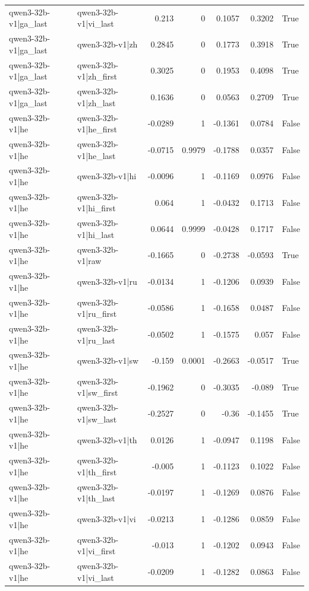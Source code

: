 \begin{table}
\begin{tabular}{l l r r r r l}
qwen3-32b-v1|ga_last & qwen3-32b-v1|vi_last & 0.213 & 0 & 0.1057 & 0.3202 & True \\
qwen3-32b-v1|ga_last & qwen3-32b-v1|zh & 0.2845 & 0 & 0.1773 & 0.3918 & True \\
qwen3-32b-v1|ga_last & qwen3-32b-v1|zh_first & 0.3025 & 0 & 0.1953 & 0.4098 & True \\
qwen3-32b-v1|ga_last & qwen3-32b-v1|zh_last & 0.1636 & 0 & 0.0563 & 0.2709 & True \\
qwen3-32b-v1|he & qwen3-32b-v1|he_first & -0.0289 & 1 & -0.1361 & 0.0784 & False \\
qwen3-32b-v1|he & qwen3-32b-v1|he_last & -0.0715 & 0.9979 & -0.1788 & 0.0357 & False \\
qwen3-32b-v1|he & qwen3-32b-v1|hi & -0.0096 & 1 & -0.1169 & 0.0976 & False \\
qwen3-32b-v1|he & qwen3-32b-v1|hi_first & 0.064 & 1 & -0.0432 & 0.1713 & False \\
qwen3-32b-v1|he & qwen3-32b-v1|hi_last & 0.0644 & 0.9999 & -0.0428 & 0.1717 & False \\
qwen3-32b-v1|he & qwen3-32b-v1|raw & -0.1665 & 0 & -0.2738 & -0.0593 & True \\
qwen3-32b-v1|he & qwen3-32b-v1|ru & -0.0134 & 1 & -0.1206 & 0.0939 & False \\
qwen3-32b-v1|he & qwen3-32b-v1|ru_first & -0.0586 & 1 & -0.1658 & 0.0487 & False \\
qwen3-32b-v1|he & qwen3-32b-v1|ru_last & -0.0502 & 1 & -0.1575 & 0.057 & False \\
qwen3-32b-v1|he & qwen3-32b-v1|sw & -0.159 & 0.0001 & -0.2663 & -0.0517 & True \\
qwen3-32b-v1|he & qwen3-32b-v1|sw_first & -0.1962 & 0 & -0.3035 & -0.089 & True \\
qwen3-32b-v1|he & qwen3-32b-v1|sw_last & -0.2527 & 0 & -0.36 & -0.1455 & True \\
qwen3-32b-v1|he & qwen3-32b-v1|th & 0.0126 & 1 & -0.0947 & 0.1198 & False \\
qwen3-32b-v1|he & qwen3-32b-v1|th_first & -0.005 & 1 & -0.1123 & 0.1022 & False \\
qwen3-32b-v1|he & qwen3-32b-v1|th_last & -0.0197 & 1 & -0.1269 & 0.0876 & False \\
qwen3-32b-v1|he & qwen3-32b-v1|vi & -0.0213 & 1 & -0.1286 & 0.0859 & False \\
qwen3-32b-v1|he & qwen3-32b-v1|vi_first & -0.013 & 1 & -0.1202 & 0.0943 & False \\
qwen3-32b-v1|he & qwen3-32b-v1|vi_last & -0.0209 & 1 & -0.1282 & 0.0863 & False \\

\end{tabular}
\end{table}
